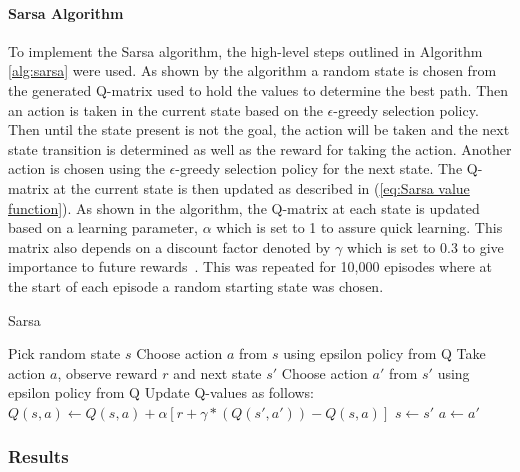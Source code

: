 \documentclass[12pt,american]{report}
\begin{document}
\paragraph{Sarsa Algorithm}
To implement the Sarsa algorithm, the high-level steps outlined in Algorithm \ref{alg:sarsa} were used.  As shown by the algorithm a random state is chosen from the generated Q-matrix used to hold the values to determine the best path.  Then an action is taken in the current state based on the \begin{math}\epsilon\end{math}-greedy selection policy.  Then until the state present is not the goal, the action will be taken and the next state transition is determined as well as the reward for taking the action. Another action is chosen using the \begin{math}\epsilon\end{math}-greedy selection policy for the next state. The Q-matrix at the current state is then updated as described in (\ref{eq:Sarsa value function}). As shown in the algorithm, the Q-matrix at each state is updated based on a learning parameter, \begin{math}\alpha\end{math} which is set to 1 to assure quick learning. This matrix also depends on a discount factor denoted by \begin{math}\gamma\end{math} which is set to 0.3 to give importance to future rewards~\cite{Eden}. This was repeated for 10,000 episodes where at the start of each episode a random starting state was chosen.



\begin{algorithm}
\caption{Sarsa~\cite{Eden}}
\label{alg:sarsa}
\begin{algorithmic} 
\State Pick random state $s$
\State Choose action $a$ from $s$ using epsilon policy from Q
\State Take action $a$, observe reward $r$ and next state $s'$
\State Choose action $a'$ from $s'$ using epsilon policy from Q
\State Update Q-values as follows:
\State $Q(s,a) \leftarrow Q(s,a) + \alpha [r+ \gamma*(Q(s',a')) - Q(s,a)] $
\State $s \leftarrow s'$
\State $a \leftarrow a'$
\EndWhile
\EndFor
\end{algorithmic}
\end{algorithm}


\subsubsection{Results}
\end{document}
